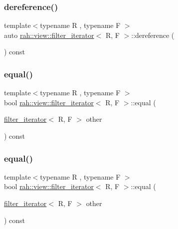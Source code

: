 \subsubsection{\texorpdfstring{dereference()}{dereference()}\hspace{0.1cm}{\footnotesize\ttfamily [2/2]}}
{\footnotesize\ttfamily template$<$typename R , typename F $>$ \\
auto \mbox{\hyperlink{structrah_1_1view_1_1filter__iterator}{rah\+::view\+::filter\+\_\+iterator}}$<$ R, F $>$\+::dereference (\begin{DoxyParamCaption}{ }\end{DoxyParamCaption}) const\hspace{0.3cm}{\ttfamily [inline]}}

\mbox{\label{structrah_1_1view_1_1filter__iterator_a4ab0c322842146d3011ae7c88deb82f7}} 
\subsubsection{\texorpdfstring{equal()}{equal()}\hspace{0.1cm}{\footnotesize\ttfamily [1/2]}}
{\footnotesize\ttfamily template$<$typename R , typename F $>$ \\
bool \mbox{\hyperlink{structrah_1_1view_1_1filter__iterator}{rah\+::view\+::filter\+\_\+iterator}}$<$ R, F $>$\+::equal (\begin{DoxyParamCaption}\item[{\mbox{\hyperlink{structrah_1_1view_1_1filter__iterator}{filter\+\_\+iterator}}$<$ R, F $>$}]{other }\end{DoxyParamCaption}) const\hspace{0.3cm}{\ttfamily [inline]}}

\mbox{\label{structrah_1_1view_1_1filter__iterator_a4ab0c322842146d3011ae7c88deb82f7}} 
\subsubsection{\texorpdfstring{equal()}{equal()}\hspace{0.1cm}{\footnotesize\ttfamily [2/2]}}
{\footnotesize\ttfamily template$<$typename R , typename F $>$ \\
bool \mbox{\hyperlink{structrah_1_1view_1_1filter__iterator}{rah\+::view\+::filter\+\_\+iterator}}$<$ R, F $>$\+::equal (\begin{DoxyParamCaption}\item[{\mbox{\hyperlink{structrah_1_1view_1_1filter__iterator}{filter\+\_\+iterator}}$<$ R, F $>$}]{other }\end{DoxyParamCaption}) const\hspace{0.3cm}{\ttfamily [inline]}}

